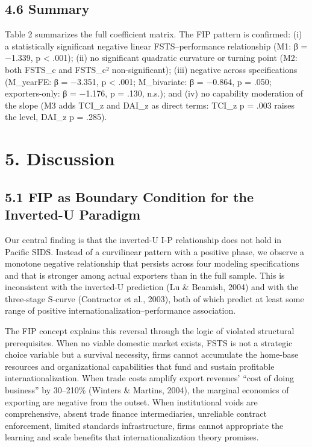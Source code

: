\documentclass[
  12pt]{article}
\begin{document}
\hypertarget{summary}{%
\subsection{4.6 Summary}\label{summary}}

Table 2 summarizes the full coefficient matrix. The FIP pattern is
confirmed: (i) a statistically significant negative linear
FSTS--performance relationship (M1: β = −1.339, p \textless{} .001);
(ii) no significant quadratic curvature or turning point (M2: both
FSTS\_c and FSTS\_c² non-significant); (iii) negative across
specifications (M\_yearFE: β = −3.351, p \textless{} .001; M\_bivariate:
β = −0.864, p = .050; exporters-only: β = −1.176, p = .130, n.s.); and
(iv) no capability moderation of the slope (M3 adds TCI\_z and DAI\_z as
direct terms: TCI\_z p = .003 raises the level, DAI\_z p = .285).

\hypertarget{discussion}{%
\section{5. Discussion}\label{discussion}}

\hypertarget{fip-as-boundary-condition-for-the-inverted-u-paradigm}{%
\subsection{5.1 FIP as Boundary Condition for the Inverted-U
Paradigm}\label{fip-as-boundary-condition-for-the-inverted-u-paradigm}}

Our central finding is that the inverted-U I-P relationship does not
hold in Pacific SIDS. Instead of a curvilinear pattern with a positive
phase, we observe a monotone negative relationship that persists across
four modeling specifications and that is stronger among actual exporters
than in the full sample. This is inconsistent with the inverted-U
prediction (Lu \& Beamish, 2004) and with the three-stage S-curve
(Contractor et al., 2003), both of which predict at least some range of
positive internationalization--performance association.

The FIP concept explains this reversal through the logic of violated
structural prerequisites. When no viable domestic market exists, FSTS is
not a strategic choice variable but a survival necessity, firms cannot
accumulate the home-base resources and organizational capabilities that
fund and sustain profitable internationalization. When trade costs
amplify export revenues' ``cost of doing business'' by 30--210\%
(Winters \& Martins, 2004), the marginal economics of exporting are
negative from the outset. When institutional voids are comprehensive,
absent trade finance intermediaries, unreliable contract enforcement,
limited standards infrastructure, firms cannot appropriate the learning
and scale benefits that internationalization theory promises.
\end{document}
